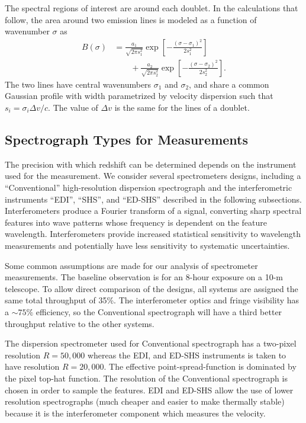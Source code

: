 \documentclass[preprint2, 10pt]{aastex}
\begin{document}
{The spectral regions of interest
are around each doublet.  In the calculations that follow,
the area around two emission lines
is modeled as a function of wavenumber $\sigma$ as
\begin{align}
B(\sigma)& =\frac{a_1}{\sqrt{2\pi s_1^2}}\exp{\left[-\frac{\left(\sigma-\sigma_1\right)^2}{2s_1^2}\right]} \nonumber\\
 &\qquad +\frac{a_2}{\sqrt{2\pi s_2^2}}\exp{\left[-\frac{\left(\sigma-\sigma_2\right)^2}{2s_2^2}\right]}.
\label{input:eqn}
\end{align}
The two lines have central wavenumbers $\sigma_1$ and $\sigma_2$, and share a common Gaussian profile with width parametrized by velocity dispersion
such that $s_i=\sigma_i\Delta v/c$.
The value of 
$\Delta v$ is the same for the lines of a doublet.



\subsection{Spectrograph Types for Measurements} 

The precision with which redshift can be determined depends on the instrument used for the measurement.
We consider several spectrometers designs, including a ``Conventional'' high-resolution dispersion spectrograph and the
interferometric instruments ``EDI'',
``SHS'', and ``ED-SHS'' described in the following subsections.  Interferometers produce a Fourier transform of a signal, converting sharp
spectral features into wave patterns whose frequency is dependent on the feature wavelength.  Interferometers provide
increased statistical sensitivity to wavelength measurements and potentially have less sensitivity to systematic
uncertainties.

Some common assumptions are made for our analysis of spectrometer 
measurements. 
The baseline observation is for an 8-hour exposure on a 10-m telescope.
To allow direct comparison of the 
designs, all systems are assigned the same total throughput of
 35\%.
The interferometer optics and fringe visibility has a $\sim 75\%$ efficiency, so the Conventional spectrograph
will have a third better throughput relative to the other systems.

The dispersion spectrometer used for Conventional spectrograph has a two-pixel resolution $R=50{,}000$
whereas the EDI, and ED-SHS instruments is taken to have resolution $R=20{,}000$.  The
effective point-spread-function is dominated by the pixel top-hat function.
The resolution of the Conventional spectrograph is chosen in order to sample the features.
EDI and ED-SHS allow the use of lower resolution spectrographs (much cheaper and easier to make thermally stable)
because it is the interferometer component which measures the velocity.


}
\end{document}
